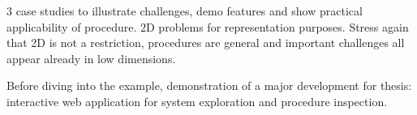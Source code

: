 3 case studies to illustrate challenges, demo features and show practical applicability of procedure.
2D problems for representation purposes.
Stress again that 2D is not a restriction, procedures are general and important challenges all appear already in low dimensions.

Before diving into the example, demonstration of a major development for thesis: interactive web application for system exploration and procedure inspection.

